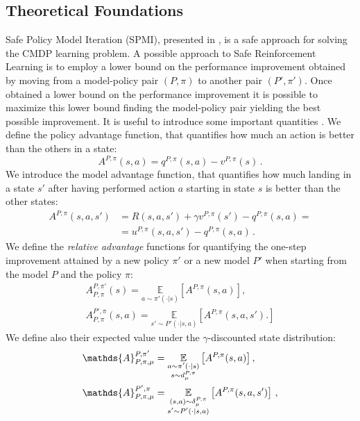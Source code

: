  \subsection{Theoretical Foundations}
 
 Safe Policy Model Iteration (SPMI), presented in \citep{cmdp}, is a safe approach for solving the CMDP learning problem. A possible approach to Safe Reinforcement Learning is to employ a lower bound on the performance improvement obtained by moving from a model-policy pair $(P, \pi)$ to another pair $(P', \pi')$. Once obtained a lower bound on the performance improvement it is possible to maximize this lower bound finding the model-policy pair yielding the best possible improvement.
It is useful to introduce some important quantities \citep{Kakade:2002:AOA:645531.656005, pmlr-v28-pirotta13}. 
We define the policy advantage function, that quantifies how much an action is better than the others in a state:
\begin{equation}
	A^{P,\pi}(s,a) = q^{P, \pi}(s,a) - v^{P, \pi}(s) \, .
\end{equation}
We introduce the model advantage function, that quantifies how much landing in a state $s'$ after having performed action $a$ starting in state $s$ is better than the other states:
\begin{align}
	A^{P,\pi}(s,a,s') &= R(s,a,s') + \gamma v^{P, \pi}(s') - q^{P,\pi}(s,a) =\\
	&= u^{P,\pi}(s,a,s') - q^{P,\pi}(s,a) \, .
\end{align}
We define the \textit{relative advantage} functions for quantifying the one-step improvement attained by a new policy $\pi'$ or a new model $P'$ when starting from the model $P$ and the policy $\pi$:
\begin{align}
	A_{P,\pi}^{P,\pi'}(s) = \underset{a \sim \pi'(\cdot | s)}{\mathbb{E}} \left[ A^{P,\pi}(s,a) \right], \\
	A_{P,\pi}^{P',\pi}(s,a) =  \underset{s' \sim P'(\cdot | s,a)}{\mathbb{E}} \left[ A^{P,\pi}(s,a,s'). \right]
\end{align}
We define also their expected value under the $\gamma$-discounted state distribution:
\begin{align}
	& \mathds{A}_{P,\pi, \mu}^{P,\pi'} = \underset{\begin{subarray}{c}
	a \sim \pi'(\cdot | s) \\
	s \sim d_\mu^{P,\pi}
\end{subarray}}{\mathbb{E}}
	\left[ A^{P,\pi}(s,a) \right], \\
	& \mathds{A}_{P,\pi, \mu}^{P',\pi} =  \underset{
	\begin{subarray}{c}
		(s,a) \sim \delta_\mu^{P,\pi} \\
		s' \sim P'(\cdot | s,a)
	\end{subarray}}{\mathbb{E}} \left[ A^{P,\pi}(s,a,s') \right] \, ,
\end{align}
